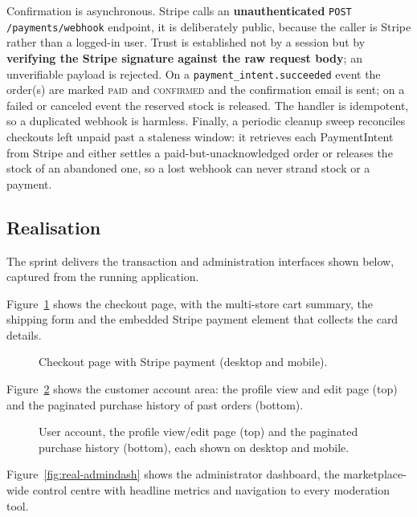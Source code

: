 Confirmation is asynchronous. Stripe calls an \textbf{unauthenticated}
\texttt{POST /payments/webhook} endpoint, it is deliberately public,
because the caller is Stripe rather than a logged-in user. Trust is
established not by a session but by \textbf{verifying the Stripe
signature against the raw request body}; an unverifiable payload is
rejected. On a \texttt{payment\_intent.succeeded} event the order(s) are
marked \textsc{paid} and \textsc{confirmed} and the confirmation email is
sent; on a failed or canceled event the reserved stock is released. The
handler is idempotent, so a duplicated webhook is harmless. Finally, a
periodic cleanup sweep reconciles checkouts left unpaid past a staleness
window: it retrieves each PaymentIntent from Stripe and either settles a
paid-but-unacknowledged order or releases the stock of an abandoned one,
so a lost webhook can never strand stock or a payment.

\subsection{Realisation}

The sprint delivers the transaction and administration interfaces shown
below, captured from the running application.

Figure~\ref{fig:real-checkout} shows the checkout page, with the
multi-store cart summary, the shipping form and the embedded Stripe
payment element that collects the card details.

\begin{figure}[H]
  \centering
  \caption{Checkout page with Stripe payment (desktop and mobile).}
  \label{fig:real-checkout}
\end{figure}

Figure~\ref{fig:real-profile} shows the customer account area: the profile
view and edit page (top) and the paginated purchase history of past orders
(bottom).

\begin{figure}[H]
  \centering
  \caption{User account, the profile view/edit page (top) and the paginated purchase history (bottom), each shown on desktop and mobile.}
  \label{fig:real-profile}
\end{figure}

Figure~\ref{fig:real-admindash} shows the administrator dashboard, the
marketplace-wide control centre with headline metrics and navigation to
every moderation tool.

